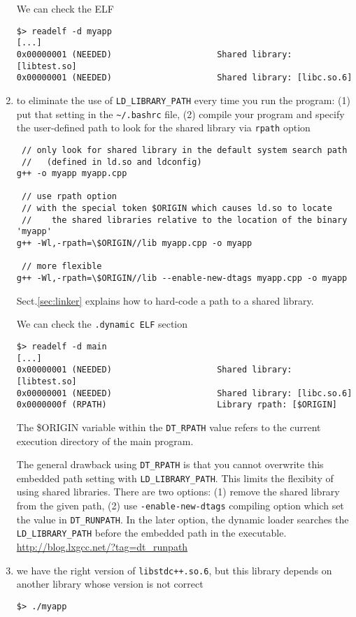 \begin{enumerate}
We can check the ELF
\begin{verbatim}
$> readelf -d myapp
[...]
0x00000001 (NEEDED)                     Shared library: [libtest.so]
0x00000001 (NEEDED)                     Shared library: [libc.so.6]
\end{verbatim}

  \item to eliminate the use of \verb!LD_LIBRARY_PATH! every time you run the program:
  (1) put that setting in the \verb!~/.bashrc! file, (2) compile your program and specify the user-defined path to look for the 
  shared library via \verb!rpath! option
  
\begin{verbatim} 
 // only look for shared library in the default system search path 
 //   (defined in ld.so and ldconfig)
g++ -o myapp myapp.cpp

 // use rpath option
 // with the special token $ORIGIN which causes ld.so to locate
 //    the shared libraries relative to the location of the binary 'myapp'
g++ -Wl,-rpath=\$ORIGIN//lib myapp.cpp -o myapp

 // more flexible
g++ -Wl,-rpath=\$ORIGIN//lib --enable-new-dtags myapp.cpp -o myapp
\end{verbatim}
Sect.\ref{sec:linker} explains how to hard-code a path to a shared library.

We can check the \verb!.dynamic ELF! section
\begin{verbatim}
$> readelf -d main
[...]
0x00000001 (NEEDED)                     Shared library: [libtest.so]
0x00000001 (NEEDED)                     Shared library: [libc.so.6]
0x0000000f (RPATH)                      Library rpath: [$ORIGIN]
\end{verbatim}
The \$ORIGIN variable within the \verb!DT_RPATH! value refers to the current execution directory of the main program.

The general drawback using \verb!DT_RPATH! is that you cannot overwrite this
embedded path setting with \verb!LD_LIBRARY_PATH!. This limits the flexibity of
using shared libraries. There are two options: (1) remove the shared library
from the given path, (2) use \verb!-enable-new-dtags! compiling option which set
the value in \verb!DT_RUNPATH!.
In the later option, the dynamic loader searches the \verb!LD_LIBRARY_PATH!
before the embedded path in the executable.
\url{http://blog.lxgcc.net/?tag=dt_runpath}

  \item we have the right version of \verb!libstdc++.so.6!, but this library depends on another 
  library whose version is not correct
\begin{verbatim}
$> ./myapp


\end{verbatim}
\end{enumerate}
